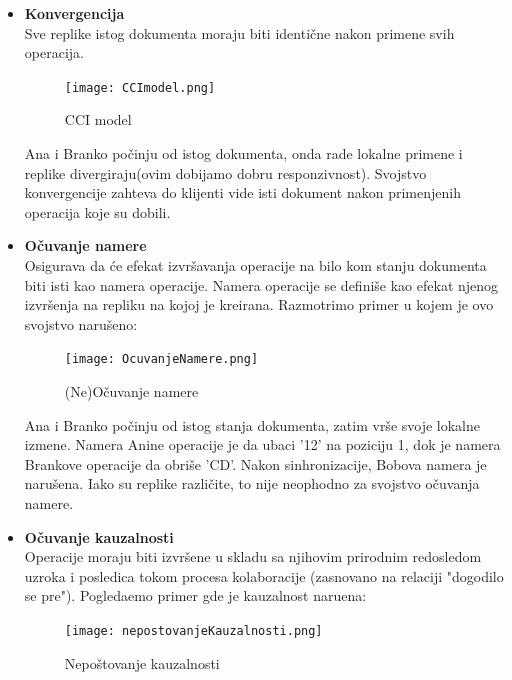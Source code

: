 \documentclass[12pt]{article}
\begin{document}
\begin{itemize}
	\item \textbf{Konvergencija} \\
	      Sve replike istog dokumenta moraju biti identične nakon primene svih operacija.
	      
	      \begin{figure}[H]
	      	\centering
	      	\texttt{[image: CCImodel.png]}
	      	\caption{CCI model}
	      	
	      \end{figure}
	      Ana i Branko počinju od istog dokumenta, onda rade lokalne primene i replike divergiraju(ovim dobijamo dobru responzivnost). Svojstvo konvergencije zahteva do klijenti vide isti dokument nakon primenjenih operacija koje su dobili.
	      
	\item \textbf{Očuvanje namere} \\
	      Osigurava da će efekat izvršavanja operacije na bilo kom stanju dokumenta biti isti kao namera operacije. Namera operacije se definiše kao efekat njenog izvršenja na repliku na kojoj je kreirana. Razmotrimo primer u kojem je ovo svojstvo narušeno:
	      
	      \begin{figure}[H]
	      	\centering
	      	\texttt{[image: OcuvanjeNamere.png]}
	      	\caption{(Ne)Očuvanje namere}
	      	
	      \end{figure}
	      Ana i Branko počinju od istog stanja dokumenta, zatim vrše svoje lokalne izmene. Namera Anine operacije je da ubaci '12' na poziciju 1, dok je namera Brankove operacije da obriše 'CD'. Nakon sinhronizacije, Bobova namera je narušena. Iako su replike različite, to nije neophodno za svojstvo očuvanja namere. 
	      
	\item \textbf{Očuvanje kauzalnosti} \\
	      Operacije moraju biti izvršene u skladu sa njihovim prirodnim redosledom uzroka i posledica tokom procesa kolaboracije (zasnovano na relaciji "dogodilo se pre"). Pogledaemo primer gde je kauzalnost naruena:
	      
	      \begin{figure}[H]
	      	\centering
	      	\texttt{[image: nepostovanjeKauzalnosti.png]}
	      	\caption{Nepoštovanje kauzalnosti}
	      	
	      \end{figure}
	      

\end{itemize}
\end{document}
